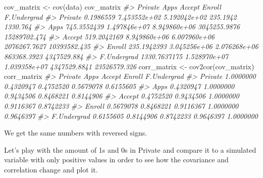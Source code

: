 \documentclass[
]{article}
\newenvironment{Shaded}{\begin{snugshade}}{\end{snugshade}}
\newcommand{\CommentTok}[1]{\textcolor[rgb]{0.56,0.35,0.01}{\textit{#1}}}
\newcommand{\FunctionTok}[1]{\textcolor[rgb]{0.00,0.00,0.00}{#1}}
\newcommand{\NormalTok}[1]{#1}
\newcommand{\OtherTok}[1]{\textcolor[rgb]{0.56,0.35,0.01}{#1}}
\begin{document}
\begin{Shaded}
\begin{Highlighting}[]
\NormalTok{cov\_matrix }\OtherTok{\textless{}{-}} \FunctionTok{cov}\NormalTok{(data)}
\NormalTok{cov\_matrix}
\CommentTok{\#\textgreater{}                  Private         Apps       Accept       Enroll  F.Undergrad}
\CommentTok{\#\textgreater{} Private        0.1986559 7.453552e+02 5.192042e+02     235.1942     1330.764}
\CommentTok{\#\textgreater{} Apps         745.3552439 1.497846e+07 8.949860e+06 3045255.9876 15289702.474}
\CommentTok{\#\textgreater{} Accept       519.2042169 8.949860e+06 6.007960e+06 2076267.7627 10393582.435}
\CommentTok{\#\textgreater{} Enroll       235.1942393 3.045256e+06 2.076268e+06  863368.3923  4347529.884}
\CommentTok{\#\textgreater{} F.Undergrad 1330.7637175 1.528970e+07 1.039358e+07 4347529.8841 23526579.326}
\NormalTok{corr\_matrix }\OtherTok{\textless{}{-}} \FunctionTok{cov2cor}\NormalTok{(cov\_matrix)}
\NormalTok{corr\_matrix}
\CommentTok{\#\textgreater{}               Private      Apps    Accept    Enroll F.Undergrad}
\CommentTok{\#\textgreater{} Private     1.0000000 0.4320947 0.4752520 0.5679078   0.6155605}
\CommentTok{\#\textgreater{} Apps        0.4320947 1.0000000 0.9434506 0.8468221   0.8144906}
\CommentTok{\#\textgreater{} Accept      0.4752520 0.9434506 1.0000000 0.9116367   0.8742233}
\CommentTok{\#\textgreater{} Enroll      0.5679078 0.8468221 0.9116367 1.0000000   0.9646397}
\CommentTok{\#\textgreater{} F.Undergrad 0.6155605 0.8144906 0.8742233 0.9646397   1.0000000}
\end{Highlighting}
\end{Shaded}

We get the same numbers with reversed signs.

\newpage

Let's play with the amount of 1s and 0s in Private and compare it to a
simulated variable with only positive values in order to see how the
covariance and correlation change and plot it.
\end{document}
